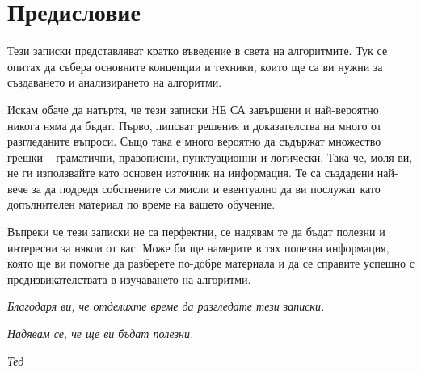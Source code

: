 \chapter*{Предисловие}

Тези записки представляват кратко въведение в света на алгоритмите.
Тук се опитах да събера основните концепции и техники, които ще са ви нужни за създаването и анализирането на алгоритми.

Искам обаче да натъртя, че тези записки НЕ СА завършени и най-вероятно никога няма да бъдат.
Първо, липсват решения и доказателства на много от разгледаните въпроси.
Също така е много вероятно да съдържат множество грешки -- граматични, правописни, пунктуационни и логически.
Така че, моля ви, не ги използвайте като основен източник на информация.
Те са създадени най-вече за да подредя собствените си мисли и евентуално да ви послужат като допълнителен материал по време на вашето обучение.

Въпреки че тези записки не са перфектни, се надявам те да бъдат полезни и интересни за някои от вас.
Може би ще намерите в тях полезна информация, която ще ви помогне да разберете по-добре материала и да се справите успешно с предизвикателствата в изучаването на алгоритми.

\vspace*{\fill}

\begin{flushright}
    \textit{Благодаря ви, че отделихте време да разгледате тези записки.}

    \textit{Надявам се, че ще ви бъдат полезни.}

    \textit{Тед}
\end{flushright}